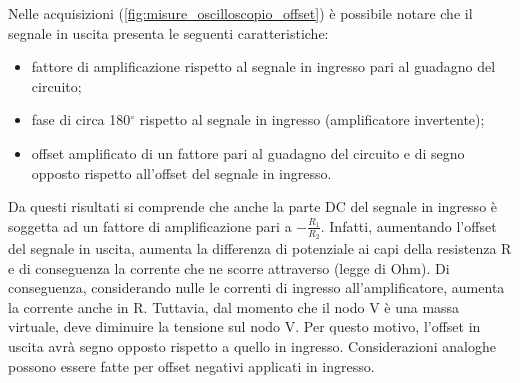 \newpage
\noindent
Nelle acquisizioni (\Fig\ref{fig:misure_oscilloscopio_offset}) è possibile notare che il segnale in uscita presenta le seguenti caratteristiche:
\begin{itemize}
	\item fattore di amplificazione rispetto al segnale in ingresso pari al guadagno del circuito;
	\item fase di circa 180$^\circ$ rispetto al segnale in ingresso (amplificatore invertente);
	\item offset amplificato di un fattore pari al guadagno del circuito e di segno opposto rispetto all'offset del segnale in ingresso.
\end{itemize}
Da questi risultati si comprende che anche la parte DC del segnale in ingresso è soggetta ad un fattore di amplificazione pari a $-\frac{R_1}{R_2}$. Infatti, aumentando l'offset del segnale in uscita, aumenta la differenza di potenziale ai capi della resistenza R e di conseguenza la corrente che ne scorre attraverso (legge di Ohm). Di conseguenza, considerando nulle le correnti di ingresso all'amplificatore, aumenta la corrente anche in R. Tuttavia, dal momento che il nodo V\super{-} è una massa virtuale, deve diminuire la tensione sul nodo V. Per questo motivo, l'offset in uscita avrà segno opposto rispetto a quello in ingresso. Considerazioni analoghe possono essere fatte per offset negativi applicati in ingresso.

